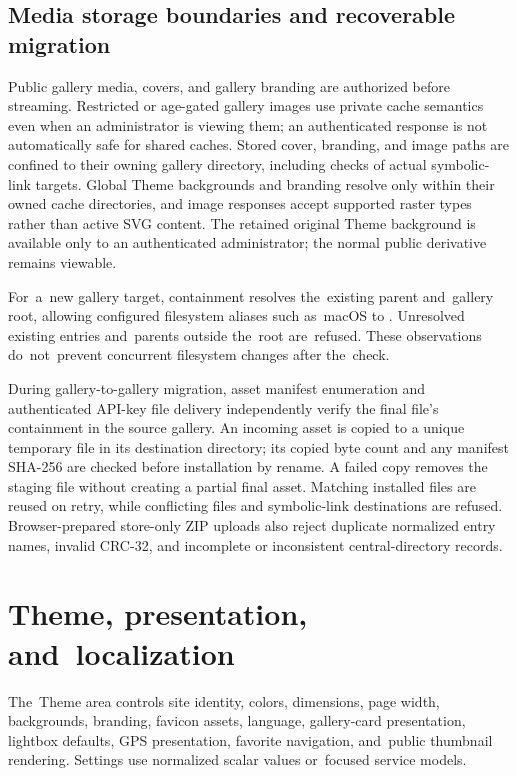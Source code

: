 \documentclass[11pt,a4paper]{article}
\newcommand{\filepath}[1]{\path{#1}}
\begin{document}
\subsection{Media storage boundaries and recoverable migration}

Public gallery media, covers, and gallery branding are authorized before
streaming. Restricted or age-gated gallery images use private cache semantics
even when an administrator is viewing them; an authenticated response is not
automatically safe for shared caches. Stored cover, branding, and image paths
are confined to their owning gallery directory, including checks of actual
symbolic-link targets. Global Theme backgrounds and branding resolve only within
their owned cache directories, and image responses accept supported raster types
rather than active SVG content. The retained original Theme background is
available only to an authenticated administrator; the normal public derivative
remains viewable.

For~a~new gallery target, containment resolves the~existing parent and~gallery
root, allowing configured filesystem aliases such as~macOS \filepath{/var} to
\filepath{/private/var}. Unresolved existing entries and~parents outside
the~root are~refused. These observations do~not~prevent concurrent filesystem
changes after the~check.

During gallery-to-gallery migration, asset manifest enumeration and
authenticated API-key file delivery independently verify the final file's
containment in the source gallery. An incoming asset is copied to a unique
temporary file in its destination directory; its copied byte count and any
manifest SHA-256 are checked before installation by rename. A failed copy
removes the staging file without creating a partial final asset. Matching
installed files are reused on retry, while conflicting files and symbolic-link
destinations are refused. Browser-prepared store-only ZIP uploads also reject
duplicate normalized entry names, invalid CRC-32, and incomplete or inconsistent
central-directory records.

\section{Theme, presentation, and~localization}
\label{sec:theme}

The~Theme area controls site identity, colors, dimensions, page width,
backgrounds, branding, favicon assets, language, gallery-card presentation,
lightbox defaults, GPS presentation, favorite navigation, and~public thumbnail
rendering. Settings use normalized scalar values or~focused service models.
\end{document}
